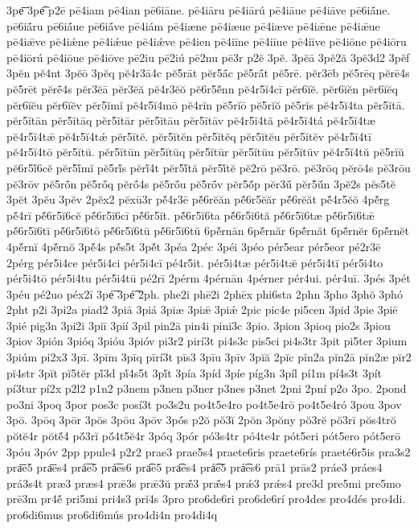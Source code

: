 {3pe͞
3pe͡
p2ē
pē4iam
pē4ian
pē6iāne.
pē4iāru
pē4iārú
pē4iāue
pē4iāve
pē6iā́ne.
pē6iā́ru
pē6iā́ue
pē6iā́ve
pē4iám
pē4iæne
pē4iæue
pē4iæve
pē4iǣne
pē4iǣue
pē4iǣve
pē4iǽne
pē4iǽue
pē4iǽve
pē4ien
pē4iīne
pē4iīue
pē4iīve
pē4iōne
pē4iōru
pē4iōrú
pē4iōue
pē4iōve
pē2iu
pē2iú
pē2nu
pē3r
p2ĕ
3pĕ.
3pĕā
3pĕ2ă
3pĕ3d2
3pĕf
3pĕn
pĕ4nt
3pĕō
3pĕq
pĕ4r3ā4c
pĕ5rāt
pĕr5ā́c
pĕ5rā́t
pĕ5rē.
pĕr3ēb
pĕ5rēq
pĕrē4s
pĕ5rēt
pĕrḗ4s
pĕr3ĕā
pĕr3ĕă
pĕ4r3ĕŏ
pĕ6r5ĕ́nn
pĕ4r5ĭ4cī
pĕr6ĭĕ.
pĕr6ĭĕn
pĕr6ĭĕq
pĕr6ĭĕu
pĕr6ĭĕv
pĕr5ĭmĭ
pĕ4r5ĭ4mō
pĕ4rĭn
pĕ5rĭō
pĕ5rĭŏ
pĕ5rĭs
pĕ4r5ĭ4ta
pĕr5ĭtā.
pĕr5ĭtān
pĕr5ĭtāq
pĕr5ĭtār
pĕr5ĭtāu
pĕr5ĭtāv
pĕ4r5ĭ4tă
pĕ4r5ĭ4tá
pĕ4r5ĭ4tæ
pĕ4r5ĭ4tǣ
pĕ4r5ĭ4tǽ
pĕr5ĭtĕ.
pĕr5ĭtĕn
pĕr5ĭtĕq
pĕr5ĭtĕu
pĕr5ĭtĕv
pĕ4r5ĭ4tī
pĕ4r5ĭ4tō
pĕr5ĭtū.
pĕr5ĭtūn
pĕr5ĭtūq
pĕr5ĭtūr
pĕr5ĭtūu
pĕr5ĭtūv
pĕ4r5ĭ4tŭ
pĕ5rĭŭ
pĕ6r5ĭ́6cĕ
pĕr5ĭ́mĭ
pĕ5rĭ́s
pĕrĭ́4t
pĕr5ĭ́tă
pĕr5ĭ́tĕ
pĕ2rō
pĕ3rō.
pĕ3rōq
pĕrō4s
pĕ3rōu
pĕ3rōv
pĕ5rṓn
pĕ5rṓq
pĕrṓ4s
pĕ5rṓu
pĕ5rṓv
pĕr5ŏ́p
pĕr3ū́
pĕr5ŭ́n
3pĕ2s
pĕs5tĕ
3pĕt
3pĕu
3pĕv
2pĕx2
pĕxū3r
pĕ́4r3ē
pĕ́6rĕăn
pĕ́6r5ĕăr
pĕ́6rĕăt
pĕ́4r5ĕŏ
4pĕ́rg
pĕ́4rī
pĕ́6r5ĭ6cĕ
pĕ́6r5ĭ6cī
pĕ́6r5ĭt.
pĕ́6r5ĭ6ta
pĕ́6r5ĭ6tă
pĕ́6r5ĭ6tæ
pĕ́6r5ĭ6tǣ
pĕ́6r5ĭ6tī
pĕ́6r5ĭ6tō
pĕ́6r5ĭ6tū
pĕ́6r5ĭ6tŭ
6pĕ́rnān
6pĕ́rnăr
6pĕ́rnăt
6pĕ́rnĕr
6pĕ́rnĕt
4pĕ́rnĭ
4pĕ́rnŏ
3pĕ́4s
pĕ́s5t
3pĕ́t
3péa
2péc
3péi
3péo
pér5ear
pér5eor
pé2r3ē
2pérg
pér5i4ce
pér5i4ci
pér5i4cī
pé4r5it.
pér5i4tæ
pér5i4tǣ
pér5i4tī
pér5i4to
pér5i4tō
pér5i4tu
pér5i4tū
pé2rī
2pérm
4pérnān
4pérner
pér4ui.
pér4uī.
3pés
3pét
3péu
pé2uo
péx2ī
3pé͞
3pé͡
2ph.
phe2i
phē2i
2phēx
phi6sta
2phn
3pho
3phŏ
3phó
2pht
p2i
3pi2a
piad2
3piā
3piá
3piæ
3piǣ
3piǽ
2pic
pic4e
pi5cen
3pid
3pie
3piē
3pié
pig3n
3pi2i
3piī
3pií
3pil
pin2ā
pin4i
pini3c
3pio.
3pion
3pioq
pio2s
3piou
3piov
3pión
3pióq
3pióu
3pióv
pi3r2
pirí3t
pi4s3c
pis5ci
pi4s3tr
3pit
pi5ter
3pium
3piúm
pi2x3
3pī.
3pīm
3pīq
pīrí3t
pīs3
3pīu
3pīv
3pĭă
2pĭc
pĭn2a
pĭn2ā
pĭn2æ
pĭr2
pĭ4str
3pĭt
pĭ5tĕr
pĭ́3d
pĭ́4s5t
3pĭ́t
3pía
3píd
3píe
píg3n
3píl
pí1m
pí4s3t
3pít
pí3tur
pí2x
p2l2
p1n2
p3nem
p3nen
p3ner
p3nes
p3net
2pni
2pní
p2o
3po.
2pond
po3ni
3poq
3por
pos3c
posí3t
po3s2u
po4t5e4ro
po4t5e4rō
po4t5e4ró
3pou
3pov
3pō.
3pōq
3pōr
3pōs
3pōu
3pōv
3pṓs
p2ŏ
pŏ3ĭ
2pŏn
3pŏny
pŏ3rĕ
pŏ3rī
pŏs4trŏ
pŏtĕ4r
pŏtĕ́4
pŏ́3rĭ
pŏ́4t5ĕ4r
3póq
3pór
pó3s4tr
pó4te4r
pót5eri
pót5ero
pót5erō
3póu
3póv
2pp
ppule4
p2r2
prae3
prae5s4
praete6ris
praete6rís
praeté6r5is
pra3s2
pra͞e5
pra͞es4
prá͞e5
prá͞es6
pra͡e5
pra͡es4
prá͡e5
prá͡es6
prā1
prās2
práe3
práes4
prá3s4t
præ3
præs4
prǣ3s
prǣ3ŭ
prǣ́3
prǣ́s4
prǽ3
prǽs4
pre3d
pre5mi
pre5mo
prē3m
pr4ĕ́
pri5mi
pri4s3
prĭ4s
3pro
pro6de6ri
pro6de6rí
pro4des
pro4dés
pro4di.
pro6di6mus
pro6di6mús
pro4di4n
pro4di4q
}
